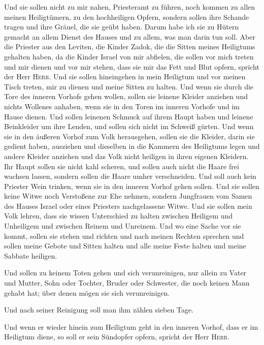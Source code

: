  Und sie sollen nicht zu mir nahen, Priesteramt zu
führen, noch kommen zu allen meinen Heiligtümern, zu den hochheiligen
Opfern, sondern sollen ihre Schande tragen und ihre Gräuel, die sie
geübt haben.  Darum habe ich sie zu Hütern gemacht an
allem Dienst des Hauses und zu allem, was man darin tun soll.
 Aber die Priester aus den Leviten, die Kinder Zadok, die
die Sitten meines Heiligtums gehalten haben, da die Kinder Israel von
mir abfielen, die sollen vor mich treten und mir dienen und vor mir
stehen, dass sie mir das Fett und Blut opfern, spricht der Herr
\textsc{Herr}.  Und sie sollen hineingehen in mein
Heiligtum und vor meinen Tisch treten, mir zu dienen und meine Sitten zu
halten.  Und wenn sie durch die Tore des inneren Vorhofs
gehen wollen, sollen sie leinene Kleider anziehen und nichts Wollenes
anhaben, wenn sie in den Toren im inneren Vorhofe und im Hause dienen.
 Und sollen leinenen Schmuck auf ihrem Haupt haben und
leinene Beinkleider um ihre Lenden, und sollen sich nicht im Schweiß
gürten.  Und wenn sie in den äußeren Vorhof zum Volk
herausgehen, sollen sie die Kleider, darin sie gedient haben, ausziehen
und dieselben in die Kammern des Heiligtums legen und andere Kleider
anziehen und das Volk nicht heiligen in ihren eigenen Kleidern.
 Ihr Haupt sollen sie nicht kahl scheren, und sollen auch
nicht die Haare frei wachsen lassen, sondern sollen die Haare umher
verschneiden.  Und soll auch kein Priester Wein trinken,
wenn sie in den inneren Vorhof gehen sollen.  Und sie
sollen keine Witwe noch Verstoßene zur Ehe nehmen, sondern Jungfrauen
vom Samen des Hauses Israel oder eines Priesters nachgelassene Witwe.
 Und sie sollen mein Volk lehren, dass sie wissen
Unterschied zu halten zwischen Heiligem und Unheiligem und zwischen
Reinem und Unreinem.  Und wo eine Sache vor sie kommt,
sollen sie stehen und richten und nach meinen Rechten sprechen und
sollen meine Gebote und Sitten halten und alle meine Feste halten und
meine Sabbate heiligen.

 Und sollen zu keinem Toten gehen und sich verunreinigen,
nur allein zu Vater und Mutter, Sohn oder Tochter, Bruder oder
Schwester, die noch keinen Mann gehabt hat; über denen mögen sie sich
verunreinigen.

 Und nach seiner Reinigung soll man ihm zählen sieben
Tage.

 Und wenn er wieder hinein zum Heiligtum geht in den
inneren Vorhof, dass er im Heiligtum diene, so soll er sein Sündopfer
opfern, spricht der Herr \textsc{Herr}.

